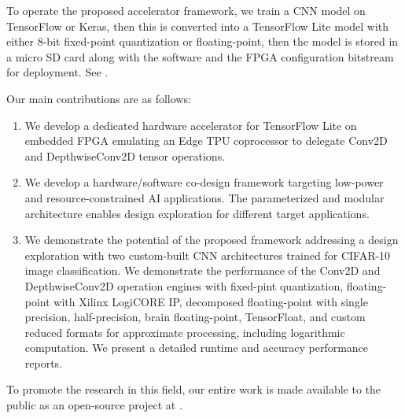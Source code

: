 To operate the proposed accelerator framework, we train a CNN model on TensorFlow or Keras, then this is converted into a TensorFlow Lite model with either 8-bit fixed-point quantization or floating-point, then the model is stored in a micro SD card along with the software and the FPGA configuration bitstream for deployment. See .

Our main contributions are as follows:
\begin{enumerate}
	\item We develop a dedicated hardware accelerator for TensorFlow Lite on embedded FPGA emulating an Edge TPU coprocessor to delegate Conv2D and DepthwiseConv2D tensor operations.
	\item We develop a hardware/software co-design framework targeting low-power and resource-constrained AI applications. The parameterized and modular architecture enables design exploration for different target applications.
	\item We demonstrate the potential of the proposed framework addressing a design exploration with two custom-built CNN architectures trained for CIFAR-10 image classification. We demonstrate the performance of the Conv2D and DepthwiseConv2D operation engines with fixed-pint quantization, floating-point with Xilinx LogiCORE IP, decomposed floating-point with single precision, half-precision, brain floating-point, TensorFloat, and custom reduced formats for approximate processing, including logarithmic computation. We present a detailed runtime and accuracy performance reports.
\end{enumerate}

To promote the research in this field, our entire work is made available to the public as an open-source project at .